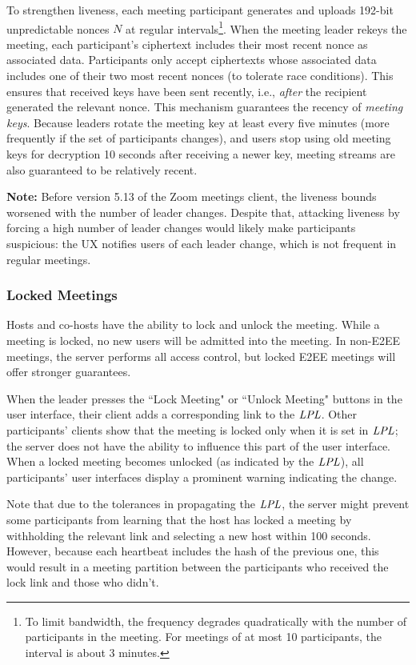To strengthen liveness, each meeting participant generates and uploads
192-bit unpredictable nonces $N$ at regular intervals\footnote{To limit bandwidth, the frequency degrades quadratically with the number of participants in the meeting. For meetings of at most 10 participants, the interval is about 3 minutes.}. When the meeting leader rekeys the meeting, each participant's
ciphertext includes their most recent nonce as associated data. 
Participants only accept ciphertexts whose associated data includes one of their two most recent nonces (to tolerate race conditions). This ensures that received keys have been sent recently, i.e., \textit{after} the recipient generated the relevant nonce.
This mechanism guarantees the recency of \textit{meeting keys}. Because leaders rotate the meeting key at least every five minutes (more frequently if the set of participants changes), and users stop using old meeting keys for decryption 10 seconds after receiving a newer key, meeting streams are also guaranteed to be relatively recent.

\textbf{Note: } Before version 5.13 of the Zoom meetings client, the liveness bounds worsened with the number of leader changes. Despite that, attacking liveness by forcing a high number of leader changes would likely make participants suspicious: the UX notifies users of each leader change, which is not frequent in regular meetings.

\subsubsection{Locked Meetings}
\label{subsubsec:lockedmeetings}
Hosts and co-hosts have the ability to lock and unlock the meeting. While a meeting is locked, no
new users will be admitted into the meeting. In non-E2EE meetings, the server performs all access
control, but locked E2EE meetings will offer stronger guarantees.

When the leader presses the ``Lock Meeting" or ``Unlock Meeting" buttons in the user interface,
their client adds a corresponding link to the $\mathit{LPL}$. Other participants' clients show that the
meeting is locked only when it is set in $\mathit{LPL}$; the server does not have the ability to influence
this part of the user interface. When a locked meeting becomes unlocked (as indicated by the
$\mathit{LPL}$), all participants' user interfaces display a prominent warning indicating the change. 

Note that due to the tolerances in propagating the $\mathit{LPL}$, the server might prevent some participants
from learning that the host has locked a meeting by withholding the relevant link and selecting a
new host within 100 seconds. However, because each heartbeat includes the hash of the previous one,
this would result in a meeting partition between the participants who received the lock link and
those who didn't.


